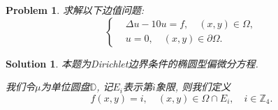\documentclass[a4paper, 12pt]{ctexart}
\theoremstyle{plain}
\newtheorem{problem}{Problem}[section]
\theoremstyle{plain}
\theoremstyle{plain}
\theoremstyle{nonumberplain}
\newtheorem{solution}{Solution}
\begin{document}
    \begin{problem}
        \label{problem: 1}
        求解以下边值问题:
        \begin{equation}
            \left\{
            \begin{aligned}
                &\Delta u-10u=f,\quad (x,y)\in\Omega,\\
                &u=0,\quad (x,y)\in\partial\Omega.
            \end{aligned}
            \right.
        \end{equation}
    \end{problem}

    \begin{solution}
        本题为Dirichlet边界条件的椭圆型偏微分方程.

        我们令$\mu$为单位圆盘$\mathbb{D}$, 记$E_{i}$表示第$i$象限, 则我们定义
        \begin{equation}
            f(x, y) = i,\quad (x, y)\in\Omega\cap E_{i},\quad i\in\mathbb{Z}_{4}.
        \end{equation}


\end{solution}
\end{document}
